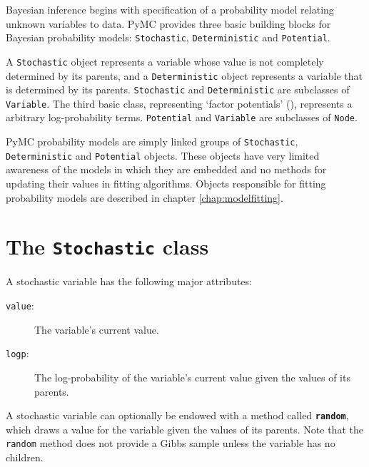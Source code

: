 
Bayesian inference begins with specification of a probability model relating unknown variables to data. PyMC provides three basic building blocks for Bayesian probability models: \texttt{Stochastic}, \texttt{Deterministic} and \texttt{Potential}. 

A \texttt{Stochastic} object represents a variable whose value is not completely determined by its parents, and a \texttt{Deterministic} object represents a variable that is determined by its parents. \texttt{Stochastic} and \texttt{Deterministic} are subclasses of \texttt{Variable}. The third basic class, representing `factor potentials' (\cite{dawidmarkov,jordangraphical}), represents a arbitrary log-probability terms. \texttt{Potential} and \texttt{Variable} are subclasses of \texttt{Node}.


\medskip
PyMC probability models are simply linked groups of \texttt{Stochastic}, \texttt{Deterministic} and \texttt{Potential} objects. These objects have very limited awareness of the models in which they are embedded and no methods for updating their values in fitting algorithms. Objects responsible for fitting probability models are described in chapter \ref{chap:modelfitting}.
 

\hypertarget{stochastic}{}
\section*{The \texttt{Stochastic} class} \label{stochastic}

A stochastic variable has the following major attributes: 
\begin{description}
    \item[\texttt{value}:] The variable's current value.
    \item[\texttt{logp}:] The log-probability of the variable's current value given the values of its parents.
\end{description}
A stochastic variable can optionally be endowed with a method called \texttt{\bfseries random}, which draws a value for the variable given the values of its parents. Note that the \texttt{random} method does not provide a Gibbs sample unless the variable has no children.

